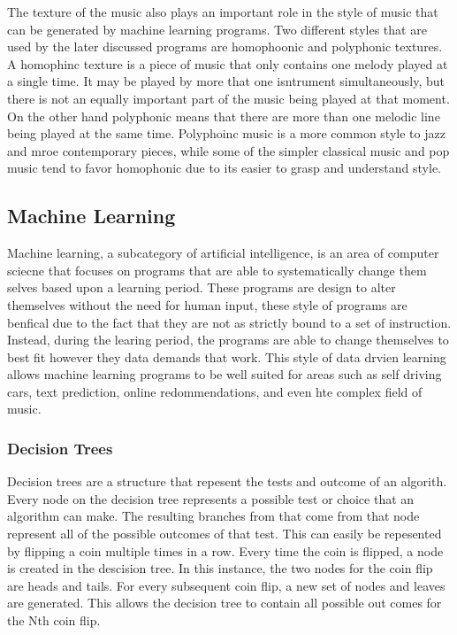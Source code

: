 \documentclass{sig-alternate}
\begin{document}
The texture of the music also plays an important role in the style of music that can be generated by machine learning programs. Two different styles that are used by the later discussed programs are homophoonic and polyphonic textures. A homophinc texture  is a piece of music that only contains one melody played at a single time. It may be played by more that one isntrument simultaneously, but there is not an equally important part of the music being played at that moment. On the other hand polyphonic means that there are more than one melodic line being played at the same time. Polyphoinc music is a more common style to jazz and mroe contemporary pieces, while some of the simpler classical music and pop music tend to favor homophonic due to its easier to grasp and understand style. 

\subsection{Machine Learning}
\label{sec:machinelearning}
	Machine learning, a subcategory of artificial intelligence, is an area of computer sciecne that focuses on programs that are able to systematically change them selves based upon a learning period. These programs are design to alter themselves without the need for human input, these style of programs are benfical due to the fact that they are not as strictly bound to a set of instruction. Instead, during the learing period, the programs are able to change themselves to best fit however they data demands that work. This style of data drvien learning allows machine learning programs to be well suited for areas such as self driving cars, text prediction, online redommendations, and even hte complex field of music. 
\subsubsection{Decision Trees}
\label{sec:decision_trees}
	Decision trees are a structure that repesent the tests and outcome of an algorith. Every node on the decision tree represents a possible test or choice that an algorithm can make. The resulting branches from that come from that node represent all of the possible outcomes of that test. This can easily be repesented by flipping a coin multiple times in a row. Every time the coin is flipped, a node is created in the descision tree. In this instance, the two nodes for the coin flip are heads and tails. For every subsequent coin flip, a new set of nodes and leaves are generated. This allows the decision tree to contain all possible out comes for the Nth coin flip. 
\end{document}
